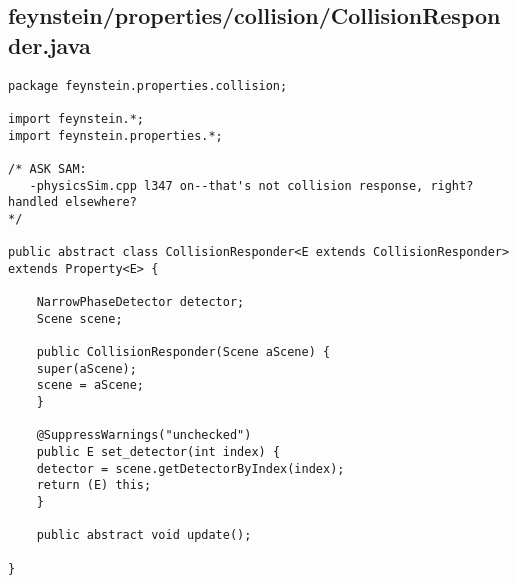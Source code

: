 \subsection*{feynstein/properties/collision/CollisionResponder.java}
\begin{lstlisting}
package feynstein.properties.collision;

import feynstein.*;
import feynstein.properties.*;

/* ASK SAM:
   -physicsSim.cpp l347 on--that's not collision response, right? handled elsewhere?
*/

public abstract class CollisionResponder<E extends CollisionResponder> extends Property<E> {
    
    NarrowPhaseDetector detector;
    Scene scene;

    public CollisionResponder(Scene aScene) {
	super(aScene);
	scene = aScene;
    }

    @SuppressWarnings("unchecked")
    public E set_detector(int index) {
	detector = scene.getDetectorByIndex(index);
	return (E) this;
    }

    public abstract void update();

}\end{lstlisting}

